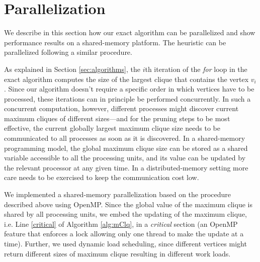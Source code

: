 \section{Parallelization}
\label{sec:parallelization}


 We describe in this section how our exact algorithm can be parallelized and show performance results
on a shared-memory platform. The heuristic can be parallelized following a similar procedure.

As explained in Section \ref{sec:algorithms}, the $i$th iteration of the {\em for} loop in the exact algorithm computes the size of the largest clique that contains the vertex $v_i$. Since our algorithm doesn't require a specific order in which vertices have to be processed, these iterations can in principle be performed concurrently. In such a concurrent computation, however, different processes might discover current maximum cliques of different sizes---and 
for the pruning steps to be most effective, the current globally largest maximum clique size needs to be communicated to all processes as soon as it is discovered. In a shared-memory programming model, the global maximum clique size can be stored as a shared variable accessible to all the processing units, and its value can be updated by the relevant processor at any given time. In a distributed-memory setting more care needs to be exercised to keep the communication cost low. 

We implemented a shared-memory parallelization based on the procedure described above using OpenMP. Since the global value of the maximum clique is shared by all processing units, we embed the updating of the maximum clique, i.e. Line \ref{critical} of Algorithm \ref{alg:mClq}, in a {\it critical} section (an OpenMP feature that enforces a lock allowing only one thread to make the update at a time). Further, we used  dynamic load scheduling, since different vertices might return different sizes of maximum clique resulting in different work loads.

